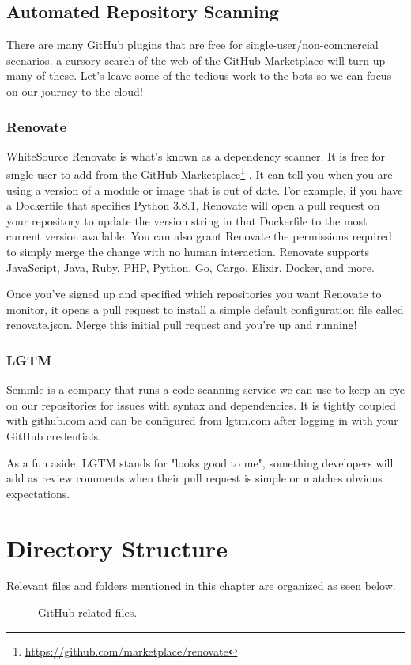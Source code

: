 \subsection{Automated Repository Scanning}

\justify
There are many GitHub plugins that are free for
single-user/non-commercial scenarios. a cursory search of the web of the
GitHub Marketplace will turn up many of these. Let's leave some of the
tedious work to the bots so we can focus on our journey to the cloud!


\subsubsection{Renovate}

WhiteSource Renovate is what's known as a dependency scanner. It is free
for single user to add from the GitHub Marketplace\footnote{\url{https://github.com/marketplace/renovate}}
. It can tell you when you are using a version of a module or image that
is out of date. For example, if you have a Dockerfile that specifies
Python 3.8.1, Renovate will open a pull request on your repository to
update the version string in that Dockerfile to the most current version
available. You can also grant Renovate the permissions required to
simply merge the change with no human interaction. Renovate supports
JavaScript, Java, Ruby, PHP, Python, Go, Cargo, Elixir, Docker, and
more.

\justify
Once you've signed up and specified which repositories you want Renovate
to monitor, it opens a pull request to install a simple default
configuration file called renovate.json. Merge this initial pull request
and you're up and running!

\subsubsection{LGTM}

Semmle is a company that runs a code scanning service we can use to keep
an eye on our repositories for issues with syntax and dependencies. It
is tightly coupled with github.com and can be configured from lgtm.com
after logging in with your GitHub credentials.

\justify
As a fun aside, LGTM stands for "looks good to me", something developers
will add as review comments when their pull request is simple or matches
obvious expectations.

\clearpage


\section{Directory Structure}

Relevant files and folders mentioned in this chapter are organized as
seen below.

\begin{figure}[!htb]
      
      \caption{GitHub related files.}
\end{figure}
